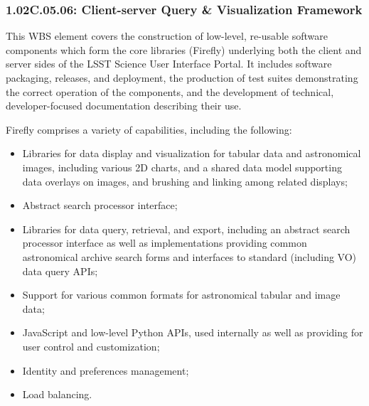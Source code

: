 \subsubsection*{1.02C.05.06: Client-server Query \& Visualization Framework}
This WBS element covers the construction of low-level, re-usable software components which form the core libraries (Firefly) underlying both the client and server sides of the LSST Science User Interface Portal. It includes software packaging, releases, and deployment, the production of test suites demonstrating the correct operation of the components, and the development of technical, developer-focused documentation describing their use.

Firefly comprises a variety of capabilities, including the following:
\begin{itemize}

\item{Libraries for data display and visualization for tabular data and astronomical images, including various 2D charts, and a shared data model supporting data overlays on images, and brushing and linking among related displays;}
\item{Abstract search processor interface;}
\item{Libraries for data query, retrieval, and export, including an abstract search processor interface as well as implementations providing common astronomical archive search forms and interfaces to standard (including VO) data query APIs;}

\item{Support for various common formats for astronomical tabular and image data;}
\item{JavaScript and low-level Python APIs, used internally as well as providing for user control and customization;}
\item{Identity and preferences management;}
\item{Load balancing.}

\end{itemize}

